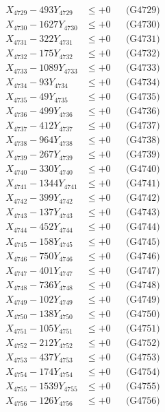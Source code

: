 \documentclass[a4paper,10pt]{article}
\begin{document}
{\begin{align}
X_{4729} - 493Y_{4729} &\leq +0 && \text{(G4729)} \\
X_{4730} - 1627Y_{4730} &\leq +0 && \text{(G4730)} \\
\allowbreak
X_{4731} - 322Y_{4731} &\leq +0 && \text{(G4731)} \\
X_{4732} - 175Y_{4732} &\leq +0 && \text{(G4732)} \\
X_{4733} - 1089Y_{4733} &\leq +0 && \text{(G4733)} \\
X_{4734} - 93Y_{4734} &\leq +0 && \text{(G4734)} \\
X_{4735} - 49Y_{4735} &\leq +0 && \text{(G4735)} \\
X_{4736} - 499Y_{4736} &\leq +0 && \text{(G4736)} \\
X_{4737} - 412Y_{4737} &\leq +0 && \text{(G4737)} \\
X_{4738} - 964Y_{4738} &\leq +0 && \text{(G4738)} \\
X_{4739} - 267Y_{4739} &\leq +0 && \text{(G4739)} \\
X_{4740} - 330Y_{4740} &\leq +0 && \text{(G4740)} \\
\allowbreak
X_{4741} - 1344Y_{4741} &\leq +0 && \text{(G4741)} \\
X_{4742} - 399Y_{4742} &\leq +0 && \text{(G4742)} \\
X_{4743} - 137Y_{4743} &\leq +0 && \text{(G4743)} \\
X_{4744} - 452Y_{4744} &\leq +0 && \text{(G4744)} \\
X_{4745} - 158Y_{4745} &\leq +0 && \text{(G4745)} \\
X_{4746} - 750Y_{4746} &\leq +0 && \text{(G4746)} \\
X_{4747} - 401Y_{4747} &\leq +0 && \text{(G4747)} \\
X_{4748} - 736Y_{4748} &\leq +0 && \text{(G4748)} \\
X_{4749} - 102Y_{4749} &\leq +0 && \text{(G4749)} \\
X_{4750} - 138Y_{4750} &\leq +0 && \text{(G4750)} \\
\allowbreak
X_{4751} - 105Y_{4751} &\leq +0 && \text{(G4751)} \\
X_{4752} - 212Y_{4752} &\leq +0 && \text{(G4752)} \\
X_{4753} - 437Y_{4753} &\leq +0 && \text{(G4753)} \\
X_{4754} - 174Y_{4754} &\leq +0 && \text{(G4754)} \\
X_{4755} - 1539Y_{4755} &\leq +0 && \text{(G4755)} \\
X_{4756} - 126Y_{4756} &\leq +0 && \text{(G4756)} \\

\end{align}}
\end{document}
